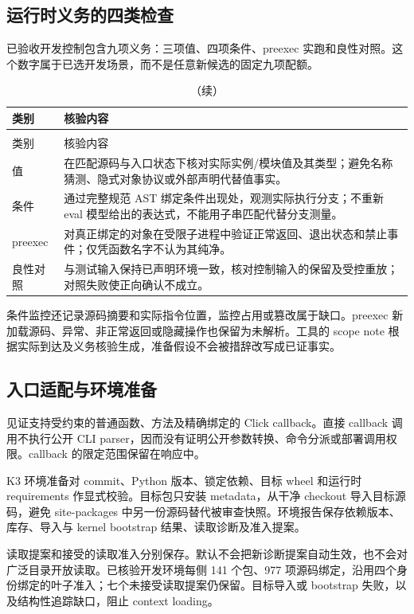 \subsection{运行时义务的四类检查}
已验收开发控制包含九项义务：三项值、四项条件、preexec 实跑和良性对照。这个数字属于已选开发场景，而不是任意新候选的固定九项配额。\cite{stage2c}
\begin{longtable}{L{33mm}L{116mm}}
\caption{见证义务及其需要排除的误解释。}\\
\toprule 类别 & 核验内容\\\midrule\endfirsthead
\caption[]{（续）}\\
\toprule 类别 & 核验内容\\\midrule\endhead
值 & 在匹配源码与入口状态下核对实际实例/模块值及其类型；避免名称猜测、隐式对象协议或外部声明代替值事实。\\
条件 & 通过完整规范 AST 绑定条件出现处，观测实际执行分支；不重新 eval 模型给出的表达式，不能用子串匹配代替分支测量。\\
preexec & 对真正绑定的对象在受限子进程中验证正常返回、退出状态和禁止事件；仅凭函数名字不认为其纯净。\\
良性对照 & 与测试输入保持已声明环境一致，核对控制输入的保留及受控重放；对照失败使正向确认不成立。\\
\bottomrule
\end{longtable}
条件监控还记录源码摘要和实际指令位置，监控占用或篡改属于缺口。preexec 新加载源码、异常、非正常返回或隐藏操作也保留为未解析。工具的 scope note 根据实际到达及义务核验生成，准备假设不会被措辞改写成已证事实。

\subsection{入口适配与环境准备}
见证支持受约束的普通函数、方法及精确绑定的 Click callback。直接 callback 调用不执行公开 CLI parser，因而没有证明公开参数转换、命令分派或部署调用权限。callback 的限定范围保留在响应中。

K3 环境准备对 commit、Python 版本、锁定依赖、目标 wheel 和运行时 requirements 作显式校验。目标包只安装 metadata，从干净 checkout 导入目标源码，避免 site-packages 中另一份源码替代被审查快照。环境报告保存依赖版本、库存、导入与 kernel bootstrap 结果、读取诊断及准入提案。

读取提案和接受的读取准入分别保存。默认不会把新诊断提案自动生效，也不会对广泛目录开放读取。已核验开发环境每侧 141 个包、977 项源码绑定，沿用四个身份绑定的叶子准入；七个未接受读取提案仍保留。目标导入或 bootstrap 失败，以及结构性追踪缺口，阻止 context loading。

